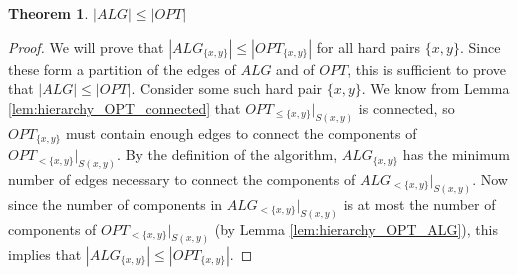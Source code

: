 \documentclass[11pt,letterpaper]{article}
\newtheorem{theorem}{Theorem}[section]
\theoremstyle{definition}
\begin{document}
\begin{theorem} \label{lem:hierarchy_main}
$|ALG| \leq |OPT|$
\end{theorem}
\begin{proof}
  We will prove that $|ALG_{\{x,y\}}| \leq |OPT_{\{x,y\}}|$ for all
  hard pairs $\{x,y\}$.  Since these form a partition of the edges of
  $ALG$ and of $OPT$, this is sufficient to prove that $|ALG| \leq
  |OPT|$.  Consider some such hard pair $\{x,y\}$.  We know from Lemma
  \ref{lem:hierarchy_OPT_connected} that $OPT_{\leq
    \{x,y\}}|_{S(x,y)}$ is connected, so $OPT_{\{x,y\}}$ must contain
  enough edges to connect the components of $OPT_{<
    \{x,y\}}|_{S(x,y)}$.  By the definition of the algorithm,
  $ALG_{\{x,y\}}$ has the minimum number of edges necessary to connect
  the components of $ALG_{< \{x,y\}}|_{S(x,y)}$.  Now since the number
  of components in $ALG_{< \{x,y\}}|_{S(x,y)}$ is at most the number
  of components of $OPT_{< \{x,y\}}|_{S(x,y)}$ (by Lemma
  \ref{lem:hierarchy_OPT_ALG}), this implies that $|ALG_{\{x,y\}}|
  \leq |OPT_{\{x,y\}}|$.
\end{proof}


\newpage



\end{document}
